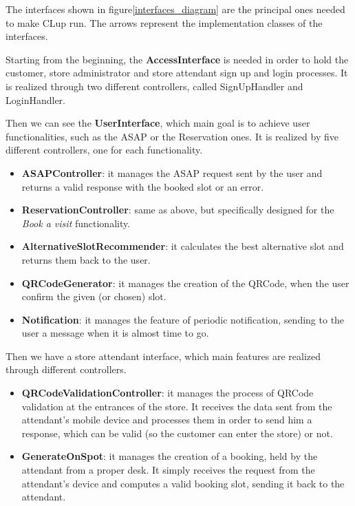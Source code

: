 \documentclass[table, 12pt]{article}
\begin{document}
The interfaces shown in figure\ref{interfaces_diagram} are the principal ones needed to make CLup run. The arrows represent the implementation classes of the interfaces.

Starting from the beginning, the \textbf{AccessInterface} is needed in order to hold the customer, store administrator and store attendant sign up and login processes. It is realized through two different controllers, called SignUpHandler and LoginHandler.

Then we can see the \textbf{UserInterface}, which main goal is to achieve user functionalities, such as the ASAP or the Reservation ones. It is realized by five different controllers, one for each functionality.
\begin{itemize}
    \item \textbf{ASAPController}: it manages the ASAP request sent by the user and returns a valid response with the booked slot or an error.
    \item \textbf{ReservationController}: same as above, but specifically designed for the \textit{Book a visit} functionality.
    \item \textbf{AlternativeSlotRecommender}: it calculates the best alternative slot and returns them back to the user.
    \item \textbf{QRCodeGenerator}: it manages the creation of the QRCode, when the user confirm the given (or chosen) slot.
    \item \textbf{Notification}: it manages the feature of periodic notification, sending to the user a message when it is almost time to go.
\end{itemize}

Then we have a store attendant interface, which main features are realized through different controllers.
\begin{itemize}
    \item \textbf{QRCodeValidationController}: it manages the process of QRCode validation at the entrances of the store. It receives the data sent from the attendant's mobile device and processes them in order to send him a response, which can be valid (so the customer can enter the store) or not.
    \item \textbf{GenerateOnSpot}: it manages the creation of a booking, held by the attendant from a proper desk. It simply receives the request from the attendant's device and computes a valid booking slot, sending it back to the attendant.
\end{itemize}
\end{document}
